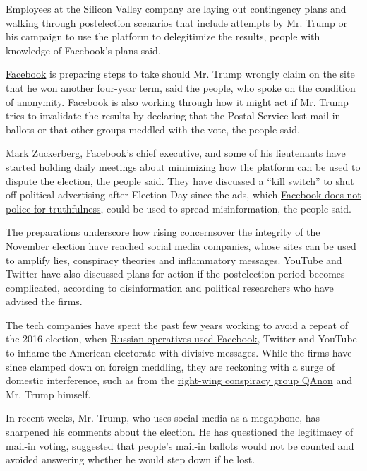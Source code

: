 Employees at the Silicon Valley company are laying out contingency plans
and walking through postelection scenarios that include attempts by Mr.
Trump or his campaign to use the platform to delegitimize the results,
people with knowledge of Facebook's plans said.

\href{https://www.nytimes3xbfgragh.onion/2020/09/03/technology/facebook-election-chaos-november.html}{Facebook}
is preparing steps to take should Mr. Trump wrongly claim on the site
that he won another four-year term, said the people, who spoke on the
condition of anonymity. Facebook is also working through how it might
act if Mr. Trump tries to invalidate the results by declaring that the
Postal Service lost mail-in ballots or that other groups meddled with
the vote, the people said.

Mark Zuckerberg, Facebook's chief executive, and some of his lieutenants
have started holding daily meetings about minimizing how the platform
can be used to dispute the election, the people said. They have
discussed a ``kill switch'' to shut off political advertising after
Election Day since the ads, which
\href{https://www.nytimes3xbfgragh.onion/2019/10/17/business/zuckerberg-facebook-free-speech.html}{Facebook
does not police for truthfulness}, could be used to spread
misinformation, the people said.

The preparations underscore how
\href{https://www.nytimes3xbfgragh.onion/2020/08/15/us/post-office-vote-by-mail.html}{rising
concerns}over the integrity of the November election have reached social
media companies, whose sites can be used to amplify lies, conspiracy
theories and inflammatory messages. YouTube and Twitter have also
discussed plans for action if the postelection period becomes
complicated, according to disinformation and political researchers who
have advised the firms.

The tech companies have spent the past few years working to avoid a
repeat of the 2016 election, when
\href{https://www.nytimes3xbfgragh.onion/2018/02/17/technology/indictment-russian-tech-facebook.html}{Russian
operatives used Facebook}, Twitter and YouTube to inflame the American
electorate with divisive messages. While the firms have since clamped
down on foreign meddling, they are reckoning with a surge of domestic
interference, such as from the
\href{https://www.nytimes3xbfgragh.onion/article/what-is-qanon.html}{right-wing
conspiracy group QAnon} and Mr. Trump himself.

In recent weeks, Mr. Trump, who uses social media as a megaphone, has
sharpened his comments about the election. He has questioned the
legitimacy of mail-in voting, suggested that people's mail-in ballots
would not be counted and avoided answering whether he would step down if
he lost.

